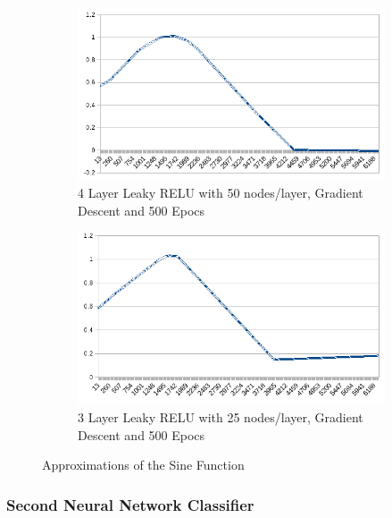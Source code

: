 \documentclass[12pt]{article}
\begin{document}
\begin{figure}
\begin{subfigure}{.5\textwidth}
  \centering
  \includegraphics[width=.8\linewidth]{./images/sineApproximation/GradientDescent25Node4LayerLeakyRELU300Batch500Iter.png}
  \caption{4 Layer Leaky RELU with 50 nodes/layer, Gradient Descent and 500 Epocs}
\end{subfigure}
\begin{subfigure}{.5\textwidth}
  \centering
  \includegraphics[width=.8\linewidth]{./images/sineApproximation/GradientDescent25Node3LayerLeakyRELU300Batch500Iter.png}
  \caption{3 Layer Leaky RELU with 25 nodes/layer, Gradient Descent and 500 Epocs}
\end{subfigure}

\caption{Approximations of the Sine Function}
\end{figure}

\subsubsection{Second Neural Network Classifier}
\end{document}
